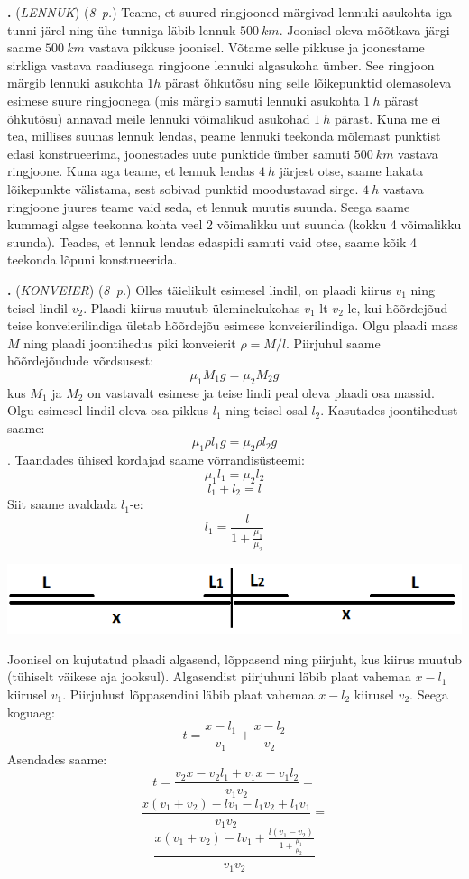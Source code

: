 \documentclass[12pt,a5paper]{article}
\newcommand{\numb}[1]{\vspace{5pt}\textbf{\large #1}}
\newcommand{\nimi}[1]{(\textsl{\small #1})}
\newcommand{\punktid}[1]{(\emph{#1~p.})}
\newcounter{ylesanne}
\newcommand{\yl}[1]{\addtocounter{ylesanne}{1}\numb{\theylesanne.} \nimi{#1} \newblock{}}
\begin{document}
\yl{LENNUK} \punktid{8} Teame, et suured ringjooned märgivad lennuki asukohta iga tunni järel ning ühe tunniga läbib lennuk $\SI{500}{km}$. Joonisel oleva mõõtkava järgi saame $\SI{500}{km}$ vastava pikkuse joonisel. Võtame selle pikkuse ja joonestame sirkliga vastava raadiusega ringjoone lennuki algasukoha ümber. See ringjoon märgib lennuki asukohta $1h$ pärast õhkutõsu ning selle lõikepunktid olemasoleva esimese suure ringjoonega (mis märgib samuti lennuki asukohta $\SI{1}{h}$ pärast õhkutõsu) annavad meile lennuki võimalikud asukohad $\SI{1}{h}$ pärast. Kuna me ei tea, millises suunas lennuk lendas, peame lennuki teekonda mõlemast punktist edasi konstrueerima, joonestades uute punktide ümber samuti $\SI{500}{km}$ vastava ringjoone. Kuna aga teame, et lennuk lendas $\SI{4}{h}$ järjest otse, saame hakata lõikepunkte välistama, sest sobivad punktid moodustavad sirge. $\SI{4}{h}$ vastava ringjoone juures teame vaid seda, et lennuk muutis suunda. Seega saame kummagi algse teekonna kohta veel 2 võimalikku uut suunda (kokku 4 võimalikku suunda). Teades, et lennuk lendas edaspidi samuti vaid otse, saame kõik 4 teekonda lõpuni konstrueerida.

\yl{KONVEIER} \punktid{8} Olles täielikult esimesel lindil, on plaadi kiirus $v_1$ ning teisel lindil $v_2$. Plaadi kiirus muutub üleminekukohas $v_1$-lt $v_2$-le, kui hõõrdejõud teise konveierilindiga ületab hõõrdejõu esimese konveierilindiga. Olgu plaadi mass $M$ ning plaadi joontihedus piki konveierit $\rho = M/l$. Piirjuhul saame hõõrdejõudude võrdsusest:
$$\mu_{1}M_1g = \mu_{2}M_2g$$
kus $M_1$ ja $M_2$ on vastavalt esimese ja teise lindi peal oleva plaadi osa massid. Olgu esimesel lindil oleva osa pikkus $l_1$ ning teisel osal $l_2$. Kasutades joontihedust saame:
$$\mu_{1} \rho l_1 g = \mu_{2}\rho l_2 g$$.
Taandades ühised kordajad saame võrrandisüsteemi:
$$\mu_{1} l_1 = \mu_{2} l_2$$
$$l_1 + l_2 = l$$
Siit saame avaldada $l_1$-e:
$$l_1 = \frac{l}{1+\frac{\mu_{1}}{\mu_{2}}}$$

\begin{center}
\includegraphics[scale=0.5]{Konveier.png}
\end{center}


Joonisel on kujutatud plaadi algasend, lõppasend ning piirjuht, kus kiirus muutub (tühiselt väikese aja jooksul). Algasendist piirjuhuni läbib plaat vahemaa $x - l_1$ kiirusel $v_1$. Piirjuhust lõppasendini läbib plaat vahemaa $x - l_2$ kiirusel $v_2$. Seega koguaeg:
$$t = \frac{x - l_1}{v_1} + \frac{x - l_2}{v_2}$$
Asendades saame:
$$t=\frac{v_2 x - v_2 l_1 + v_1 x - v_1 l_2}{v_1 v_2} =$$
$$\frac{x(v_1 + v_2) - lv_1 - l_1 v_2 + l_1 v_1}{v_1 v_2} =$$
$$\frac{x(v_1 + v_2) - lv_1 + \frac{l(v_1 - v_2)}{1+\frac{\mu_{1}}{\mu_{2}}}}{v_1 v_2}$$
\end{document}
